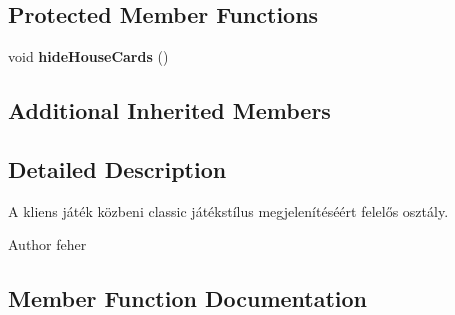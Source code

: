 \subsection*{Protected Member Functions}
\begin{DoxyCompactItemize}
\item 
\hypertarget{classhu_1_1elte_1_1bfw1p6_1_1poker_1_1client_1_1view_1_1_classic_main_view_ae877d9b6ba1261bd93cf4d3dbd0c444b}{}void {\bfseries hide\+House\+Cards} ()\label{classhu_1_1elte_1_1bfw1p6_1_1poker_1_1client_1_1view_1_1_classic_main_view_ae877d9b6ba1261bd93cf4d3dbd0c444b}

\end{DoxyCompactItemize}
\subsection*{Additional Inherited Members}


\subsection{Detailed Description}
A kliens játék közbeni classic játékstílus megjelenítéséért felelős osztály. \begin{DoxyAuthor}{Author}
feher 
\end{DoxyAuthor}


\subsection{Member Function Documentation}
\hypertarget{classhu_1_1elte_1_1bfw1p6_1_1poker_1_1client_1_1view_1_1_classic_main_view_a8a045af3925309f14df8bf03dc44ff6e}{}
